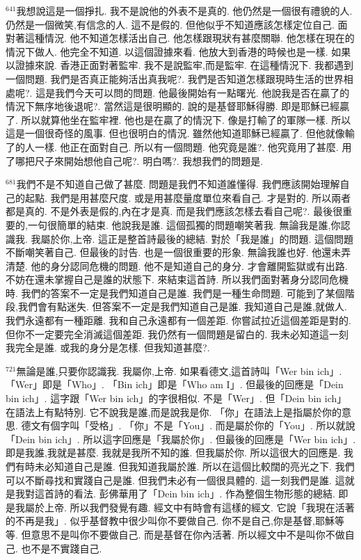 \documentclass{book}
\begin{document}
$^{641}$我想說這是一個掙扎.
我不是說他的外表不是真的.
他仍然是一個很有禮貌的人.
仍然是一個微笑,有信念的人.
這不是假的.
但他似乎不知道應該怎樣定位自己.
面對著這種情況.
他不知道怎樣活出自己.
他怎樣跟現狀有甚麼關聯.
他怎樣在現在的情況下做人.
他完全不知道.
以這個證據來看.
他放大到香港的時候也是一樣.
如果以證據來說.
香港正面對著監牢.
我不是說監牢,而是監牢.
在這種情況下.
我都遇到一個問題.
我們是否真正能夠活出真我呢?.
我們是否知道怎樣跟現時生活的世界相處呢?.
這是我們今天可以問的問題.
他最後開始有一點曙光.
他說我是否在贏了的情況下無序地後退呢?.
當然這是很明顯的.
說的是基督耶穌得勝.
即是耶穌已經贏了.
所以就算他坐在監牢裡.
他也是在贏了的情況下.
像是打輸了的軍隊一樣.
所以這是一個很奇怪的風事.
但也很明白的情況.
雖然他知道耶穌已經贏了.
但他就像輸了的人一樣.
他正在面對自己.
所以有一個問題.
他究竟是誰?.
他究竟用了甚麼.
用了哪把尺子來開始想他自己呢?.
明白嗎?.
我想我們的問題是.

$^{681}$我們不是不知道自己做了甚麼.
問題是我們不知道誰懂得.
我們應該開始理解自己的起點.
我們是用甚麼尺度.
或是用甚麼量度單位來看自己.
才是對的.
所以兩者都是真的.
不是外表是假的,內在才是真.
而是我們應該怎樣去看自己呢?.
最後很重要的,一句很簡單的結束.
他說我是誰.
這個孤獨的問題嘲笑著我.
無論我是誰,你認識我.
我屬於你,上帝.
這正是整首詩最後的總結.
對於「我是誰」的問題.
這個問題不斷嘲笑著自己.
但最後的討告.
也是一個很重要的形象.
無論我誰也好.
他還未弄清楚.
他的身分認同危機的問題.
他不是知道自己的身分.
才會離開監獄或有出路.
不妨在還未掌握自己是誰的狀態下.
來結束這首詩.
所以我們面對著身分認同危機時.
我們的答案不一定是我們知道自己是誰.
我們是一種生命問題.
可能到了某個階段,我們會有點迷失.
但答案不一定是我們知道自己是誰.
我知道自己是誰,就做人.
我們永遠都有一種距離.
我和自己永遠都有一個差距.
你嘗試拉近這個差距是對的.
但你不一定要完全消滅這個差距.
我仍然有一個問題是留白的.
我未必知道這一刻我完全是誰.
或我的身分是怎樣.
但我知道甚麼?.

$^{721}$無論是誰,只要你認識我.
我屬你,上帝.
如果看德文,這首詩叫「Wer bin ich」.
「Wer」即是「Who」.
「Bin ich」即是「Who am I」.
但最後的回應是「Dein bin ich」.
這字跟「Wer bin ich」的字很相似.
不是「Wer」.
但「Dein bin ich」在語法上有點特別.
它不說我是誰,而是說我是你.
「你」在語法上是指屬於你的意思.
德文有個字叫「受格」.
「你」不是「You」.
而是屬於你的「You」.
所以就說「Dein bin ich」.
所以這字回應是「我屬於你」.
但最後的回應是「Wer bin ich」.
即是我誰,我就是甚麼.
我就是我所不知的誰.
但我屬於你.
所以這很大的回應是.
我們有時未必知道自己是誰.
但我知道我屬於誰.
所以在這個比較闊的亮光之下.
我們可以不斷尋找和實踐自己是誰.
但我們未必有一個很具體的.
這一刻我們是誰.
這就是我對這首詩的看法.
彭佛華用了「Dein bin ich」.
作為整個生物形態的總結.
即是我屬於上帝.
所以我們發覺有趣.
經文中有時會有這樣的經文.
它說「我現在活著的不再是我」.
似乎基督教中很少叫你不要做自己.
你不是自己,你是基督,耶穌等等.
但意思不是叫你不要做自己.
而是基督在你內活著.
所以經文中不是叫你不做自己.
也不是不實踐自己.
\end{document}
